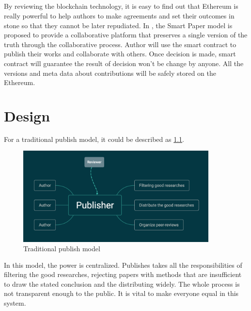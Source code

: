 \documentclass [12pt]{report}
\begin{document}
\paragraph{}
By reviewing the blockchain technology, it is easy to find out that Ethereum is really powerful to
help authors to make agreements and set their outcomes in stone so that they cannot be later repudiated.
In \cite{Khoe:1994:CML:2288694.2294265}, 
the Smart Paper model is proposed to provide a collaborative platform 
that preserves a single version of the truth through the collaborative process. 
Author will use the smart contract to publish their works and collaborate with others.
Once decision is made, smart contract will guarantee the result of decision won't be change by anyone.
All the versions and meta data about contributions will be safely stored on the Ethereum.
\chapter{Design}
For a traditional publish model, it could be described as \ref{model}.
\begin{figure}[H]
  \centering
  \includegraphics[width=0.9\textwidth]{traditionModel.png}
  \caption{Traditional publish model}
  \label{model}
\end{figure}
In this model, the power is centralized. Publishes takes all the responsibilities of filtering the good researches, 
rejecting papers with methods that are insufficient to draw the stated conclusion and the distributing widely\cite{heller2014dynamic}. 
The whole process is not transparent enough to the public.
It is vital to make everyone equal in this system.
\end{document}
